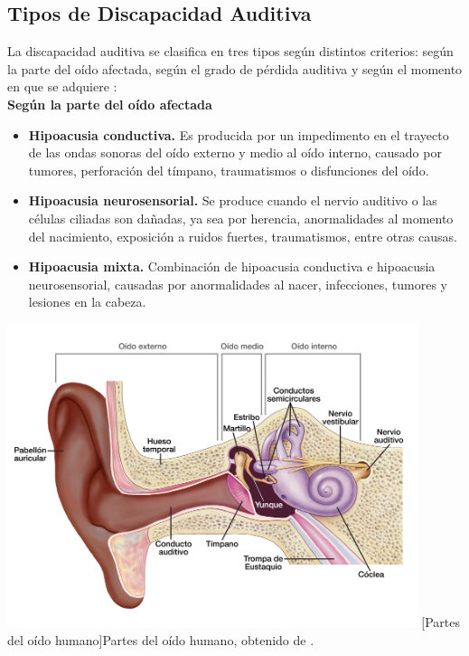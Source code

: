 \newpage
\subsection{Tipos de Discapacidad Auditiva}
La discapacidad auditiva se clasifica en tres tipos según distintos criterios: según la parte del oído afectada, según el grado de pérdida auditiva y según el momento en que se adquiere \cite{ref30}:\\
\newline\textbf{Según la parte del oído afectada}
\begin{itemize}
    \item \textbf{Hipoacusia conductiva.} Es producida por un impedimento en el trayecto de las ondas sonoras del oído externo y medio al oído interno, causado por tumores, perforación del tímpano, traumatismos o disfunciones del oído.  
    \item \textbf{Hipoacusia neurosensorial.} Se produce cuando el nervio auditivo o las células ciliadas son dañadas, ya sea por herencia, anormalidades al momento del nacimiento, exposición a ruidos fuertes, traumatismos, entre otras causas.  
    \item \textbf{Hipoacusia mixta.} Combinación de hipoacusia conductiva e hipoacusia neurosensorial, causadas por anormalidades al nacer, infecciones, tumores y lesiones en la cabeza.  
\end{itemize}

\begin{center}
    \includegraphics[width=0.9\textwidth]{Images/Cap 2/PartesOido.jpg}
    [Partes del oído humano]{Partes del oído humano, obtenido de \cite{ref31}.} 
\end{center}

